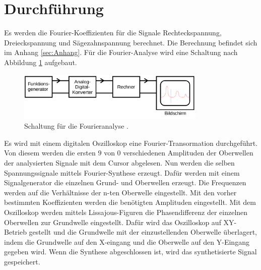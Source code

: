 \section{Durchführung}
\label{sec:Durchführung}
Es werden die Fourier-Koeffizienten für die Signale Rechteckspannung,
Dreieckspannung und Sägezahnspannung berechnet. Die Berechnung befindet sich im
Anhang \ref{sec:Anhang}.
Für die Fourier-Analyse wird eine Schaltung nach Abbildung \ref{fig:Analyseschaltung} aufgebaut.
\begin{figure}
  \centering
  \includegraphics[width=0.8\textwidth]{Analyseschaltung.png}
  \caption{Schaltung für die Fourieranalyse \cite{sample}.}
  \label{fig:Analyseschaltung}
\end{figure}
Es wird mit einem digitalen Oszilloskop eine Fourier-Transormation durchgeführt.
Von diesem werden die ersten $9$ von $0$ verschiedenen Amplituden der Oberwellen
der analysierten Signale mit dem Cursor abgelesen.
Nun werden die selben Spannungssignale mittels Fourier-Synthese erzeugt. Dafür
werden mit einem Signalgenerator die einzelnen Grund- und Oberwellen erzeugt. Die
Frequenzen werden auf die Verhältnisse der n-ten Oberwelle eingestellt.
Mit den vorher bestimmten Koeffizienten werden die benötigten Amplituden
eingestellt. Mit dem Oszilloskop werden mittels Lissajous-Figuren die
Phasendifferenz der einzelnen Oberwellen zur Grundwelle eingestellt.
Dafür wird das Oszilloskop auf XY-Betrieb gestellt und die Grundwelle mit der
einzustellenden Oberwelle überlagert, indem die Grundwelle auf den X-eingang und
die Oberwelle auf den Y-Eingang gegeben wird. Wenn die Synthese abgeschlossen ist, 
wird das synthetisierte Signal gespeichert.
